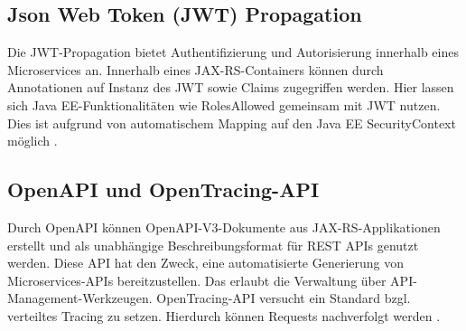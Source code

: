 \subsection{Json Web Token (JWT) Propagation}
Die JWT-Propagation bietet Authentifizierung und Autorisierung innerhalb eines Microservices an. Innerhalb eines JAX-RS-Containers können durch Annotationen auf Instanz des JWT sowie Claims zugegriffen werden. Hier lassen sich Java EE-Funktionalitäten wie  RolesAllowed gemeinsam mit JWT nutzen. Dies ist aufgrund von automatischem Mapping auf den Java EE SecurityContext möglich \cite{LarsRowekamp.2017c}. 


\subsection{OpenAPI und OpenTracing-API}
Durch OpenAPI können OpenAPI-V3-Dokumente aus JAX-RS-Applikationen erstellt und als unabhängige Beschreibungsformat für REST APIs genutzt werden. Diese API hat den Zweck, eine automatisierte Generierung von Microservices-APIs bereitzustellen. Das erlaubt die Verwaltung über API-Management-Werkzeugen.
OpenTracing-API versucht ein Standard bzgl. verteiltes Tracing zu setzen. Hierdurch können Requests nachverfolgt werden \cite{DominikMohilo2018}.  

